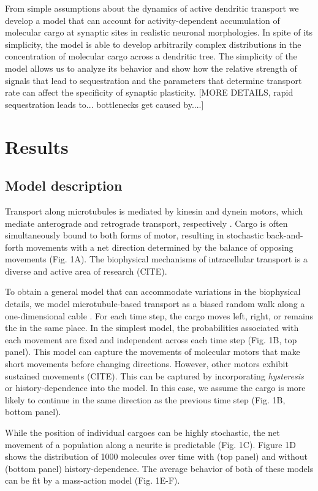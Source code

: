 \documentclass[fleqn,10pt]{wlpeerj}
\begin{document}
From simple assumptions about the dynamics of active dendritic transport we develop a model that can account for activity-dependent accumulation of molecular cargo at synaptic sites in realistic neuronal morphologies. In spite of its simplicity, the model is able to develop arbitrarily complex distributions in the concentration of molecular cargo across a dendritic tree. The simplicity of the model allows us to analyze its behavior and show how the relative strength of signals that lead to sequestration and the parameters that determine transport rate can affect the specificity of synaptic plasticity. [MORE DETAILS, rapid sequestration leads to... bottlenecks get caused by....]


\section*{Results}

\subsection*{Model description}

Transport along microtubules is mediated by kinesin and dynein motors, which mediate anterograde and retrograde transport, respectively \citep{Hirokawa_2010,Gagnon_2011}. Cargo is often simultaneously bound to both forms of motor, resulting in stochastic back-and-forth movements with a net direction determined by the balance of opposing movements \citep{Hancock_2014,Buxbaum_2014b} (Fig. 1A). The biophysical mechanisms of intracellular transport is a diverse and active area of research (CITE).

To obtain a general model that can accommodate variations in the biophysical details, we model microtubule-based transport as a biased random walk along a one-dimensional cable \citep{Bressloff_2006}. For each time step, the cargo moves left, right, or remains the in the same place. In the simplest model, the probabilities associated with each movement are fixed and independent across each time step (Fig. 1B, top panel). This model can capture the movements of molecular motors that make short movements before changing directions. However, other motors exhibit sustained movements (CITE). This can be captured by incorporating \textit{hysteresis} or history-dependence into the model. In this case, we assume the cargo is more likely to continue in the same direction as the previous time step (Fig. 1B, bottom panel).

While the position of individual cargoes can be highly stochastic, the net movement of a population along a neurite is predictable (Fig. 1C). Figure 1D shows the distribution of 1000 molecules over time with (top panel) and without (bottom panel) history-dependence. The average behavior of both of these models can be fit by a mass-action model (Fig. 1E-F).
\end{document}
